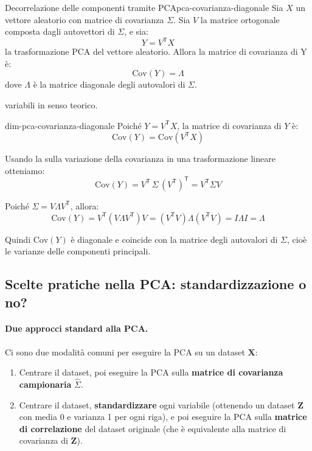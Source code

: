 \begin{proposizione}{Decorrelazione delle componenti tramite
PCA}{pca-covarianza-diagonale}
Sia \( X \) un vettore aleatorio con matrice di covarianza \(\Sigma\). Sia \( V
\) la matrice ortogonale composta dagli autovettori di \( \Sigma \), e sia:
\[
Y = V^\mathsf{T} X
\]
la trasformazione PCA del vettore aleatorio. Allora la matrice di covarianza di
Y è:
\[
\mathrm{Cov}(Y) = \Lambda
\]
dove \( \Lambda \) è la matrice diagonale degli autovalori di \( \Sigma \).
\end{proposizione}

variabili in senso teorico.
\begin{dimostrazione}{}{dim-pca-covarianza-diagonale}
Poiché \( Y = V^\mathsf{T} X \), la matrice di covarianza di \( Y \) è:
\[
\mathrm{Cov}(Y) = \mathrm{Cov}(V^\mathsf{T} X)
\]

Usando la  sulla variazione della covarianza in una
trasformazione lineare otteniamo:
\[
    \mathrm{Cov}(Y)
    = V^\mathsf{T} \, \Sigma \, (V^\mathsf{T})^\mathsf{T}
    = V^\mathsf{T} \Sigma V
\]

Poiché \( \Sigma = V \Lambda V^\mathsf{T} \), allora:
\[
\mathrm{Cov}(Y) = V^\mathsf{T} (V \Lambda V^\mathsf{T}) V = (V^\mathsf{T} V)
\Lambda (V^\mathsf{T} V) = I \Lambda I = \Lambda
\]

Quindi \( \mathrm{Cov}(Y) \) è diagonale e coincide con la matrice degli
autovalori di \( \Sigma \), cioè le varianze delle componenti principali.
\end{dimostrazione}

\subsection{Scelte pratiche nella PCA: standardizzazione o no?}

\paragraph{Due approcci standard alla PCA.}
Ci sono due modalità comuni per eseguire la PCA su un dataset \(\mathbf{X}\):

\begin{enumerate}
  \item Centrare il dataset, poi eseguire la PCA sulla \textbf{matrice di
  covarianza campionaria} \(\hat{\Sigma}\).
  \item Centrare il dataset, \textbf{standardizzare} ogni variabile (ottenendo
  un dataset \(\mathbf{Z}\) con media 0 e varianza 1 per ogni riga), e poi
  eseguire la PCA sulla \textbf{matrice di correlazione} del dataset originale
  (che è equivalente alla matrice di covarianza di \(\mathbf{Z}\)).
\end{enumerate}

